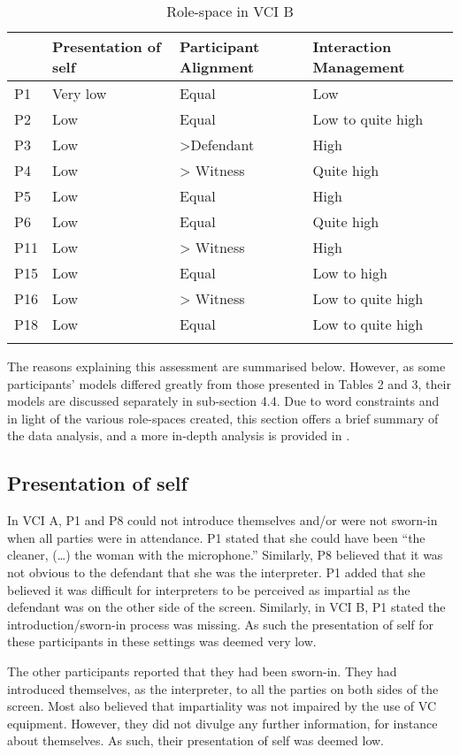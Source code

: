 \documentclass[output=paper]{langsci/langscibook}
\begin{document}
\begin{table}
\begin{tabular}{llll}
\lsptoprule
& {Presentation of self} & {Participant Alignment} & {Interaction Management}\\\midrule
P1 & Very low & Equal & Low\\
P2 & Low & Equal & Low to quite high\\
P3 & Low & >Defendant & High\\
P4 & Low & > Witness & Quite high\\
P5 & Low & Equal & High\\
P6 & Low & Equal & Quite high \\
P11 & Low & > Witness & High\\
P15 & Low & Equal & Low to high \\
P16 & Low & > Witness & Low to quite high\\
P18 & Low & Equal & Low to quite high\\
\lspbottomrule
\end{tabular}
\caption{Role-space in VCI B\label{tab:devaux:3}}
\end{table}

The reasons explaining this assessment are summarised below. However, as some participants’ models differed greatly from those presented in Tables 2 and 3, their models are discussed separately in sub-section 4.4. Due to word constraints and in light of the various role-spaces created, this section offers a brief summary of the data analysis, and a more in-depth analysis is provided in \citet{Devaux2017b}.

\subsection{Presentation of self}
In VCI A, P1 and P8 could not introduce themselves and/or were not sworn-in when all parties were in attendance. P1 stated that she could have been “the cleaner, (…) the woman with the microphone.” Similarly, P8 believed that it was not obvious to the defendant that she was the interpreter. P1 added that she believed it was difficult for interpreters to be perceived as impartial as the defendant was on the other side of the screen. Similarly, in VCI B, P1 stated the introduction/sworn-in process was missing. As such the presentation of self for these participants in these settings was deemed very low. 

The other participants reported that they had been sworn-in. They had introduced themselves, as the interpreter, to all the parties on both sides of the screen. Most also believed that impartiality was not impaired by the use of VC equipment. However, they did not divulge any further information, for instance about themselves. As such, their presentation of self was deemed low.
\end{document}
